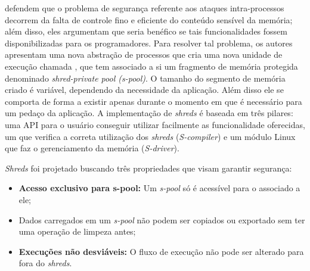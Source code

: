 \citet{shreds} defendem que o problema de segurança referente aos ataques
intra-processos decorrem da falta de controle fino e eficiente do conteúdo
sensível da memória; além disso, eles argumentam que seria benéfico se tais
funcionalidades fossem disponibilizadas para os programadores.  Para resolver tal
problema, os autores apresentam uma nova abstração de processos que cria uma
nova unidade de execução chamada , que tem associado a si um
fragmento de memória protegida denominado \emph{shred-private pool
(s-pool)}. O tamanho do segmento de memória criado é variável,
dependendo da necessidade da aplicação. Além disso ele se comporta de forma a
existir apenas durante o momento em que é necessário para um pedaço da
aplicação. A implementação de \emph{shreds} é baseada em três pilares: uma API
para o usuário conseguir utilizar facilmente as funcionalidade oferecidas, um
 que verifica a correta utilização dos
\emph{shreds} (\emph{S-compiler}) e um módulo Linux que faz o gerenciamento da
memória (\emph{S-driver}).

\emph{Shreds} foi projetado buscando três propriedades que visam garantir
segurança:

\begin{itemize}
  \item \textbf{Acesso exclusivo para s-pool:} Um \emph{s-pool} só é acessível
        para o  associado a ele;
  \item {} Dados carregados em um
        \emph{s-pool} não podem ser copiados ou exportado sem ter uma operação
        de limpeza antes;
  \item \textbf{Execuções não desviáveis:} O fluxo de execução não pode ser
        alterado para fora do \emph{shreds}.
\end{itemize}

